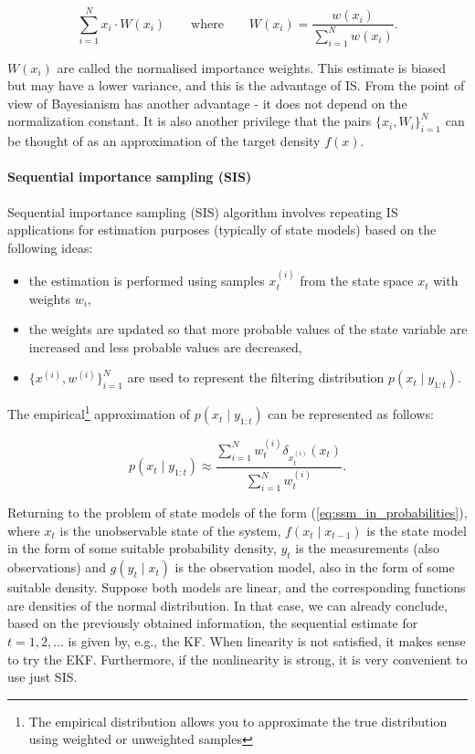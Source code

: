 \begin{equation}
\sum_{i=1}^N x_i \cdot W(x_i) \qquad\text{where}\qquad W(x_i) = \frac{w(x_i)}{\sum_{i=1}^{N} w(x_i)}.
\label{eq:is_expection_with_normalized_weights}
\end{equation}

\(W(x_i)\) are called the normalised importance weights. This estimate is biased but may have a lower variance, and this is the advantage of IS. From the point of view of Bayesianism has another advantage - it does not depend on the normalization constant. It is also another privilege that the pairs \(\{x_i,W_i\}^N_{i=1}\) can be thought of as an approximation of the target density \(f(x)\).

\paragraph*{Sequential importance sampling (SIS)}
Sequential importance sampling (SIS) algorithm involves repeating IS applications for estimation purposes (typically of state models) based on the following ideas:
\begin{itemize}
    \item the estimation is performed using samples \(x_t^{(i)}\) from the state space \(x_t\) with weights \(w_i\),
    \item the weights are updated so that more probable values of the state variable are increased and less probable values are decreased,
    \item \(\{x^{(i)},w^{(i)}\}^N_{i=1}\) are used to represent the filtering distribution \(p(x_t \mid y_{1:t})\).
\end{itemize}
The empirical\footnote{The empirical distribution allows you to approximate the true distribution using weighted or unweighted samples} approximation of \(p(x_t \mid y_{1:t})\) can be represented as follows: 

\begin{equation}
    p\left(x_t \mid y_{1: t}\right) \approx \frac{\sum_{i=1}^N w_t^{(i)} \delta_{x_t^{(i)}}\left(x_t\right)}{\sum_{i=1}^N w_t^{(i)}}.
    \label{eq:sis_expected_value}
\end{equation}

Returning to the problem of state models of the form (\ref{eq:ssm_in_probabilities}), where \(x_t\) is the unobservable state of the system, \(f(x_t \mid x_{t-1})\) is the state model in the form of some suitable probability density, \(y_t\) is the measurements (also observations) and \(g(y_t \mid x_t)\) is the observation model, also in the form of some suitable density. Suppose both models are linear, and the corresponding functions are densities of the normal distribution. In that case, we can already conclude, based on the previously obtained information,  the sequential estimate for \(t=1, 2, \ldots\) is given by, e.g., the KF. When linearity is not satisfied, it makes sense to try the EKF. Furthermore, if the nonlinearity is strong, it is very convenient to use just SIS.

